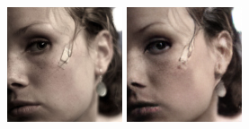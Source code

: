 \begin{figure}[h]
    \begin{minipage}{0.15\textwidth}
        \centering
        \includegraphics[width=\linewidth]{material/origin/328.png}
    \end{minipage}
    \begin{minipage}{0.15\textwidth}
        \centering
        \includegraphics[width=\linewidth]{material/vq/328.png}

\end{minipage}
\end{figure}
